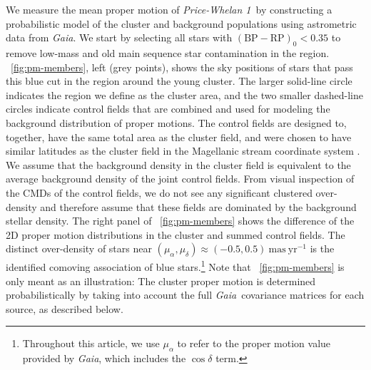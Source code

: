 \documentclass[twocolumn]{aastex62}
\newcommand{\gaia}{\textsl{Gaia}}
\newcommand{\masyr}{\ensuremath{\textrm{mas}~\textrm{yr}^{-1}}}
\newcommand{\clustername}{\textsl{Price-Whelan 1}}
\newcommand{\bprp}{\ensuremath{\textrm{BP} - \textrm{RP}}}
\begin{document}
We measure the mean proper motion of \clustername\ by constructing a probabilistic model of the cluster and background populations using astrometric data from \gaia.
We start by selecting all stars with $(\bprp)_0 < 0.35$ to remove low-mass and old main sequence star contamination in the region.
\figurename~\ref{fig:pm-members}, left (grey points), shows the sky positions of stars that pass this blue cut in the region around the young cluster.
The larger solid-line circle indicates the region we define as the cluster area, and the two smaller dashed-line circles indicate control fields that are combined and used for modeling the background distribution of proper motions.
The control fields are designed to, together, have the same total area as the cluster field, and were chosen to have similar latitudes as the cluster field in the Magellanic stream coordinate system \citep{Nidever:2008}.
We assume that the background density in the cluster field is equivalent to the average background density of the joint control fields.
From visual inspection of the CMDs of the control fields, we do not see any significant clustered over-density and therefore assume that these fields are dominated by the background stellar density.
The right panel of \figurename~\ref{fig:pm-members} shows the difference of the 2D proper motion distributions in the cluster and summed control fields.
The distinct over-density of stars near $(\mu_\alpha, \mu_\delta) \approx (-0.5, 0.5)~\masyr$ is the identified comoving association of blue stars.\footnote{Throughout this article, we use $\mu_\alpha$ to refer to the proper motion value provided by \gaia, which includes the $\cos\delta$ term.}
Note that \figurename~\ref{fig:pm-members} is only meant as an illustration: The cluster proper motion is determined probabilistically by taking into account the full \gaia\ covariance matrices for each source, as described below.
\end{document}
